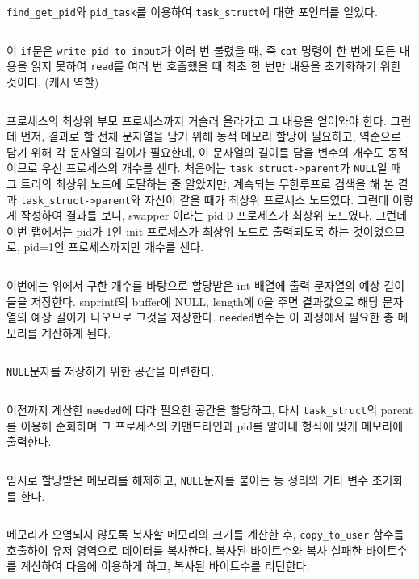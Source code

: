 \documentclass{report}
\begin{document}
\lstinline{find_get_pid}와 \lstinline{pid_task}를 이용하여 \lstinline{task_struct}에 대한 포인터를 얻었다.
\inputminted[firstline=37,lastline=37, linenos, breaklines]{C}{../kernellab-handout-done/ptree/dbfs_ptree.c}
이 \lstinline{if}문은 \lstinline{write_pid_to_input}가 여러 번 불렸을 때, 즉 \lstinline{cat} 명령이 한 번에 모든 내용을 읽지 못하여 \lstinline{read}를 여러 번 호출했을 때 최초 한 번만 내용을 초기화하기 위한 것이다. (캐시 역할)
\inputminted[firstline=38,lastline=50, linenos, breaklines, obeytabs=true,tabsize=4]{C}{../kernellab-handout-done/ptree/dbfs_ptree.c}
프로세스의 최상위 부모 프로세스까지 거슬러 올라가고 그 내용을 얻어와야 한다. 그런데 먼저, 결과로 할 전체 문자열을 담기 위해 동적 메모리 할당이 필요하고, 역순으로 담기 위해 각 문자열의 길이가 필요한데, 이 문자열의 길이를 담을 변수의 개수도 동적이므로 우선 프로세스의 개수를 센다. 처음에는 \lstinline{task_struct->parent}가 \lstinline{NULL}일 때 그 트리의 최상위 노드에 도달하는 줄 알았지만, 계속되는 무한루프로 검색을 해 본 결과 \lstinline{task_struct->parent}와 자신이 같을 때가 최상위 프로세스 노드였다. 그런데 이렇게 작성하여 결과를 보니, swapper 이라는 pid 0 프로세스가 최상위 노드였다. 그런데 이번 랩에서는 pid가 1인 init 프로세스가 최상위 노드로 출력되도록 하는 것이었으므로, pid=1인 프로세스까지만 개수를 센다.
\inputminted[firstline=51,lastline=67, linenos, breaklines, obeytabs=true,tabsize=4]{C}{../kernellab-handout-done/ptree/dbfs_ptree.c}
이번에는 위에서 구한 개수를 바탕으로 할당받은 int 배열에 출력 문자열의 예상 길이들을 저장한다. snprintf의 buffer에 NULL, length에 0을 주면 결과값으로 해당 문자열의 예상 길이가 나오므로 그것을 저장한다. \lstinline{needed}변수는 이 과정에서 필요한 총 메모리를 계산하게 된다.
\inputminted[firstline=68,lastline=69, linenos, breaklines, obeytabs=true,tabsize=4]{C}{../kernellab-handout-done/ptree/dbfs_ptree.c}
\lstinline{NULL}문자를 저장하기 위한 공간을 마련한다.
\inputminted[firstline=70,lastline=96, linenos, breaklines, obeytabs=true,tabsize=4]{C}{../kernellab-handout-done/ptree/dbfs_ptree.c}
이전까지 계산한 \lstinline{needed}에 따라 필요한 공간을 할당하고, 다시 \lstinline{task_struct}의 parent를 이용해 순회하며 그 프로세스의 커맨드라인과 pid를 알아내 형식에 맞게 메모리에 출력한다.
\inputminted[firstline=97,lastline=100, linenos, breaklines, obeytabs=true,tabsize=4]{C}{../kernellab-handout-done/ptree/dbfs_ptree.c}
임시로 할당받은 메모리를 해제하고, \lstinline{NULL}문자를 붙이는 등 정리와 기타 변수 초기화를 한다.
\inputminted[firstline=102,lastline=111, linenos, breaklines, obeytabs=true,tabsize=4]{C}{../kernellab-handout-done/ptree/dbfs_ptree.c}
메모리가 오염되지 않도록 복사할 메모리의 크기를 계산한 후, \lstinline{copy_to_user} 함수를 호출하여 유저 영역으로 데이터를 복사한다. 복사된 바이트수와 복사 실패한 바이트수를 계산하여 다음에 이용하게 하고, 복사된 바이트수를 리턴한다.
\end{document}
